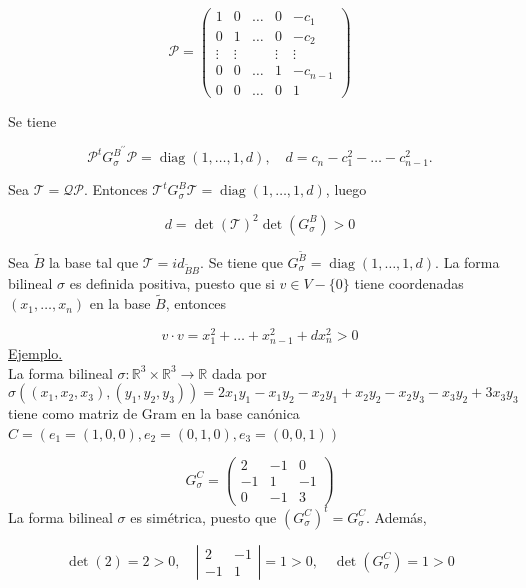 \documentclass[12pt, a4paper, ones, notitlepage, openany,titlepage]{article}
\begin{document}
$$
\mathcal{P}=\left(\begin{array}{ccccc}
	1 & 0 & \ldots & 0 & -c_{1} \\
	0 & 1 & \ldots & 0 & -c_{2} \\
	\vdots & \vdots & & \vdots & \vdots \\
	0 & 0 & \ldots & 1 & -c_{n-1} \\
	0 & 0 & \ldots & 0 & 1
\end{array}\right)
$$

Se tiene

$$
\mathcal{P}^{t} G_{\sigma}^{B^{\prime \prime}} \mathcal{P}=\operatorname{diag}\left(1,\ldots,1,d\right), \quad d=c_{n}-c_{1}^{2}-\ldots-c_{n-1}^{2} .
$$

Sea $\mathcal{T}=\mathcal{Q} \mathcal{P}$. Entonces $\mathcal{T}^{t} G_{\sigma}^{B} \mathcal{T}=\operatorname{diag}\left(1,\ldots,1,d\right)$, luego

$$
d=\operatorname{det}(\mathcal{T})^{2} \operatorname{det}\left(G_{\sigma}^{B}\right)>0
$$

Sea $\widetilde{B}$ la base tal que $\mathcal{T}=i d_{\tilde{B} B}$. Se tiene que $G_{\sigma}^{\widetilde{B}}=\operatorname{diag}\left(1,\ldots,1,d\right)$. La forma bilineal $\sigma$ es definida positiva, puesto que si $v \in V-\{0\}$ tiene coordenadas $\left(x_{1}, \ldots, x_{n}\right)$ en la base $\tilde{B}$, entonces

$$
v \cdot v=x_{1}^{2}+\ldots+x_{n-1}^{2}+d x_{n}^{2}>0
$$
\underline{Ejemplo.}\\
La forma bilineal $\sigma: \mathbb{R}^{3} \times \mathbb{R}^{3} \rightarrow \mathbb{R}$ dada por
$$
\sigma\left(\left(x_{1}, x_{2}, x_{3}\right),\left(y_{1}, y_{2}, y_{3}\right)\right) = 2 x_{1} y_{1}-x_{1} y_{2}-x_{2} y_{1}+x_{2} y_{2}-x_{2} y_{3}-x_{3} y_{2}+3 x_{3} y_{3}
$$
tiene como matriz de Gram en la base canónica $C=\left(e_{1}=(1,0,0), e_{2}=(0,1,0), e_{3}=(0,0,1)\right)$

$$
G_{\sigma}^{C}=\left(\begin{array}{rrr}
	2 & -1 & 0 \\
	-1 & 1 & -1 \\
	0 & -1 & 3
\end{array}\right)
$$
La forma bilineal $\sigma$ es simétrica, puesto que $\left(G_{\sigma}^{C}\right)^{t}=G_{\sigma}^{C}$. Además,

$$
\operatorname{det}(2)=2>0, \quad\left|\begin{array}{rr}
	2 & -1 \\
	-1 & 1
\end{array}\right|=1>0, \quad \operatorname{det}\left(G_{\sigma}^{C}\right)=1>0
$$
\end{document}
